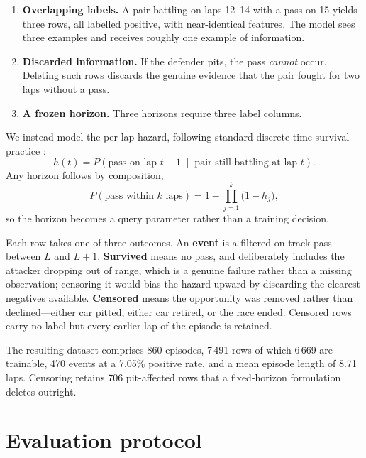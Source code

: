 \documentclass[11pt,a4paper]{article}
\begin{document}
\begin{enumerate}[label=(\alph*)]
  \item \textbf{Overlapping labels.} A pair battling on laps 12--14
        with a pass on 15 yields three rows, all labelled positive, with
        near-identical features. The model sees three examples and receives
        roughly one example of information.
  \item \textbf{Discarded information.} If the defender pits, the pass
        \emph{cannot} occur. Deleting such rows discards the genuine evidence
        that the pair fought for two laps without a pass.
  \item \textbf{A frozen horizon.} Three horizons require three label columns.
\end{enumerate}

We instead model the per-lap hazard, following standard discrete-time survival
practice \citep{singer2003applied,tutz2016modeling}:
\begin{equation}
h(t) = P\!\left(\text{pass on lap } t{+}1 \;\middle|\; \text{pair still battling at lap } t\right).
\label{eq:hazard}
\end{equation}
Any horizon follows by composition,
\begin{equation}
P(\text{pass within } k \text{ laps}) = 1 - \prod_{j=1}^{k}\bigl(1 - h_j\bigr),
\label{eq:horizon}
\end{equation}
so the horizon becomes a query parameter rather than a training decision.

Each row takes one of three outcomes. An \textbf{event} is a filtered on-track
pass between $L$ and $L+1$. \textbf{Survived} means no pass, and deliberately
includes the attacker dropping out of range, which is a genuine failure rather
than a missing observation; censoring it would bias the hazard upward by
discarding the clearest negatives available. \textbf{Censored} means the
opportunity was removed rather than declined---either car pitted, either car
retired, or the race ended. Censored rows carry no label but every earlier lap
of the episode is retained.

The resulting dataset comprises 860 episodes, 7\,491 rows of which
6\,669 are trainable, 470 events at a 7.05\% positive
rate, and a mean episode length of 8.71 laps. Censoring retains
706 pit-affected rows that a fixed-horizon formulation deletes outright.

\section{Evaluation protocol}
\label{sec:protocol}
\end{document}
